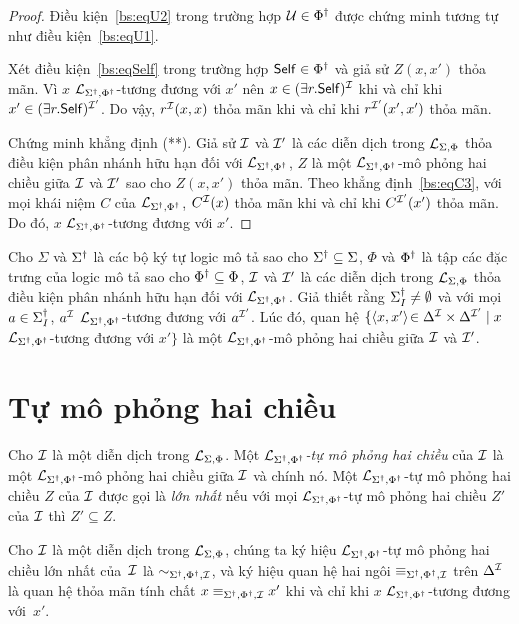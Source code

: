 \begin{proof}
	\semiItem Điều kiện~\eqref{bs:eqU2} trong trường hợp $\mathcal{U} \in \Phi^\dag$ được chứng minh tương tự như điều kiện~\eqref{bs:eqU1}.
	
	\semiItem Xét điều kiện~\eqref{bs:eqSelf} trong trường hợp $\mathsf{Self} \in \Phi^\dag$ và giả sử $Z(x,x')$ thỏa mãn. Vì $x$ $\mathcal{L}_{\Sigma^\dag,\Phi^\dag}$-tương đương với $x'$ nên $x \in (\exists r.\mathsf{Self})^{\mathcal{I}}$ khi và chỉ khi $x' \in (\exists r.\mathsf{Self})^{\mathcal{I}'}$. Do vậy, $r^{\mathcal{I}}(x,x)$ thỏa mãn khi và chỉ khi $r^{\mathcal{I}'}(x',x')$ thỏa mãn.
	
	Chứng minh khẳng định (**). Giả sử $\mathcal{I}$ và $\mathcal{I}'$ là các diễn dịch trong $\mathcal{L}_{\Sigma,\Phi}$ thỏa điều kiện phân nhánh hữu hạn đối với $\mathcal{L}_{\Sigma^\dag,\Phi^\dag}$, $Z$ là một $\mathcal{L}_{\Sigma^\dag,\Phi^\dag}$-mô phỏng hai chiều giữa $\mathcal{I}$ và $\mathcal{I}'$ sao cho $Z(x,x')$ thỏa mãn. Theo khẳng định~\eqref{bs:eqC3}, với mọi khái niệm $C$ của $\mathcal{L}_{\Sigma^\dag,\Phi^\dag}$, $C^{\mathcal{I}}(x)$ thỏa mãn khi và chỉ khi $C^{\mathcal{I}'}(x')$ thỏa mãn. Do đó, $x$ $\mathcal{L}_{\Sigma^\dag,\Phi^\dag}$-tương đương với $x'$.
\end{proof}

\begin{Corollary}
\label{co:EquivalenceRelation}
	Cho $\Sigma$ và $\Sigma^\dag$ là các bộ ký tự logic mô tả sao cho $\Sigma^\dag \subseteq \Sigma$, $\Phi$ và $\Phi^\dag$ là tập các đặc trưng của logic mô tả sao cho $\Phi^\dag \subseteq \Phi$, $\mathcal{I}$ và $\mathcal{I}'$ là các diễn dịch trong $\mathcal{L}_{\Sigma,\Phi}$ thỏa điều kiện phân nhánh hữu hạn đối với $\mathcal{L}_{\Sigma^\dag,\Phi^\dag}$. Giả thiết rằng $\Sigma^\dag_I \not= \emptyset$ và với mọi $a \in \Sigma^\dag_I$, $a^{\mathcal{I}}$ $\mathcal{L}_{\Sigma^\dag,\Phi^\dag}$-tương đương với $a^{\mathcal{I}'}$.
	Lúc đó, quan hệ $\{\left\langle x, x'\right\rangle\! \in \Delta^{\mathcal{I}} \times \Delta^{\mathcal{I}'} \mid x $ $\mathcal{L}_{\Sigma^\dag,\Phi^\dag}$-tương đương với $x'\}$ là một $\mathcal{L}_{\Sigma^\dag,\Phi^\dag}$-mô phỏng hai chiều giữa $\mathcal{I}$ và $\mathcal{I}'$.
\end{Corollary}

\section{Tự mô phỏng hai chiều}
\label{sec:Chap2.AutoBisimulation}

\begin{Definition}
\label{def:AutoBisimulation}
	Cho $\mathcal{I}$ là một diễn dịch trong $\mathcal{L}_{\Sigma,\Phi}$. Một {\em $\mathcal{L}_{\Sigma^\dag,\Phi^\dag}$-tự mô phỏng hai chiều} của $\mathcal{I}$ là một $\mathcal{L}_{\Sigma^\dag,\Phi^\dag}$-mô phỏng hai chiều giữa $\mathcal{I}$ và chính nó. Một $\mathcal{L}_{\Sigma^\dag,\Phi^\dag}$-tự mô phỏng hai chiều $Z$ của $\mathcal{I}$ được gọi là {\em lớn nhất} nếu với mọi $\mathcal{L}_{\Sigma^\dag,\Phi^\dag}$-tự mô phỏng hai chiều $Z'$ của $\mathcal{I}$ thì $Z' \subseteq Z$.\myend
\end{Definition}

Cho $\mathcal{I}$ là một diễn dịch trong $\mathcal{L}_{\Sigma,\Phi}$, chúng ta ký hiệu $\mathcal{L}_{\Sigma^\dag,\Phi^\dag}$-tự mô phỏng hai chiều lớn nhất của~$\mathcal{I}$ là $\sim_{\Sigma^\dag,\Phi^\dag,\mathcal{I}}$, và ký hiệu quan hệ hai ngôi $\equiv_{\Sigma^\dag,\Phi^\dag,\mathcal{I}}$ trên $\Delta^{\mathcal{I}}$ là quan hệ thỏa mãn tính chất $x \equiv_{\Sigma^\dag,\Phi^\dag,\mathcal{I}} x'$ khi và chỉ khi $x$ $\mathcal{L}_{\Sigma^\dag,\Phi^\dag}$-tương đương với~$x'$.

